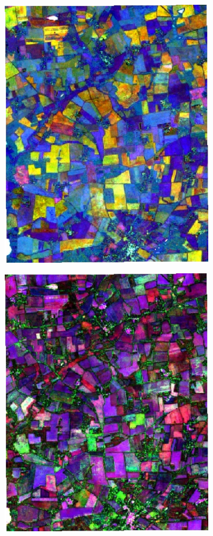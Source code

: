 \documentclass[journal,article,submit,pdftex,moreauthors]{Definitions/mdpi}
\providecommand{\DIFaddbeginFL}{} %
\providecommand{\DIFaddendFL}{} %
\providecommand{\DIFdelbeginFL}{} %
\providecommand{\DIFdelendFL}{} %
\begin{document}
\begin{figure}[H]
\begin{subfigure}[t]{0.23\linewidth}
\DIFdelendFL \DIFaddbeginFL \includegraphics[height=\linewidth,width=0.95\linewidth]{figures/aes_1_layer_mse_results/composites/composite_image_1.pdf}
	\DIFaddendFL \caption{}
	\label{fig:color_map_b}
	\end{subfigure}
	\begin{subfigure}[t]{0.23\linewidth}
		\centering
	  \DIFdelbeginFL %
\DIFdelendFL \DIFaddbeginFL \includegraphics[height=\linewidth,width=0.95\linewidth]{figures/aes_1_layer_mse_results/composites/composite_image_598481.pdf}

\end{subfigure}
\end{figure}
\end{document}
